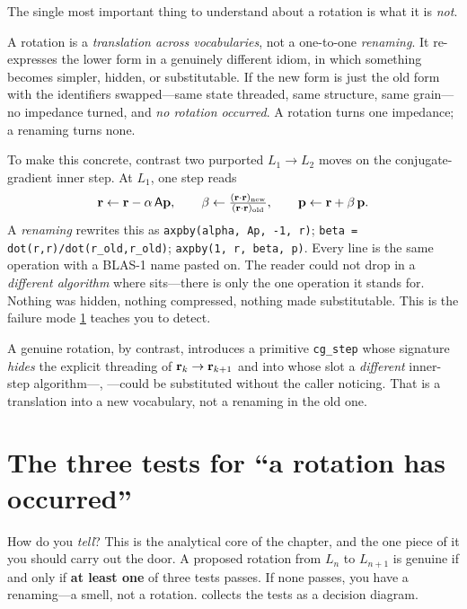 The single most important thing to understand about a rotation is what it is
\emph{not}.

\begin{keyidea}
A rotation is a \emph{translation across vocabularies}, not a one-to-one
\emph{renaming}. It re-expresses the lower form in a genuinely different idiom,
in which something becomes simpler, hidden, or substitutable. If the new form is
just the old form with the identifiers swapped---same state threaded, same
structure, same grain---no impedance turned, and \emph{no rotation occurred}. A
rotation turns one impedance; a renaming turns none.
\end{keyidea}

To make this concrete, contrast two purported $L_1 \to L_2$ moves on the
conjugate-gradient inner step. At $L_1$, one step reads
\[
  \mathbf{r} \leftarrow \mathbf{r} - \alpha\,\mathsf{A}\mathbf{p}, \qquad
  \beta \leftarrow \tfrac{(\mathbf{r}\cdot\mathbf{r})_{\text{new}}}{(\mathbf{r}\cdot\mathbf{r})_{\text{old}}},\qquad
  \mathbf{p} \leftarrow \mathbf{r} + \beta\,\mathbf{p} .
\]
A \emph{renaming} rewrites this as \lstinline[style=l4style]|axpby(alpha, Ap, -1, r)|;
\lstinline[style=l4style]|beta = dot(r,r)/dot(r_old,r_old)|;
\lstinline[style=l4style]|axpby(1, r, beta, p)|. Every line is the same operation
with a BLAS-1 name pasted on. The reader could not drop in a \emph{different
algorithm} where  sits---there is only the one operation it stands
for. Nothing was hidden, nothing compressed, nothing made substitutable. This is
the failure mode \cref{sec:tests} teaches you to detect.

A genuine rotation, by contrast, introduces a primitive
\lstinline[style=l4style]|cg_step| whose signature \emph{hides} the explicit
threading of $\mathbf{r}_k \to \mathbf{r}_{k+1}$ and into whose slot a \emph{different}
inner-step algorithm---, ---could be
substituted without the caller noticing. That is a translation into a new
vocabulary, not a renaming in the old one.

\section{The three tests for ``a rotation has occurred''}
\label{sec:tests}

How do you \emph{tell}? This is the analytical core of the chapter, and the one
piece of it you should carry out the door. A proposed rotation from $L_n$ to
$L_{n+1}$ is genuine if and only if \textbf{at least one} of three tests passes.
If none passes, you have a renaming---a smell, not a rotation. 
collects the tests as a decision diagram.

